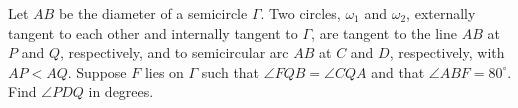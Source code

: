 Let $AB$ be the diameter of a semicircle $\Gamma$. Two circles, $\omega_1$ and $\omega_2$, externally tangent to each other and internally tangent to $\Gamma$, are tangent to the line $AB$ at $P$ and $Q$, respectively, and to semicircular arc $AB$ at $C$ and $D$, respectively, with $AP<AQ$. Suppose $F$ lies on $\Gamma$ such that $\angle{FQB}=\angle{CQA}$ and that $\angle{ABF}=80^\circ$. Find $\angle{PDQ}$ in degrees.